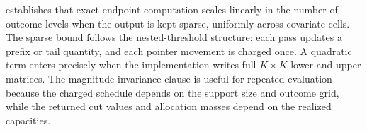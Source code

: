  establishes that exact endpoint computation scales linearly in the number of outcome levels when the output is kept sparse, uniformly across covariate cells.  The sparse bound follows the nested-threshold structure: each pass updates a prefix or tail quantity, and each pointer movement is charged once.  A quadratic term enters precisely when the implementation writes full \(K\times K\) lower and upper matrices.  The magnitude-invariance clause is useful for repeated evaluation because the charged schedule depends on the support size and outcome grid, while the returned cut values and allocation masses depend on the realized capacities.
